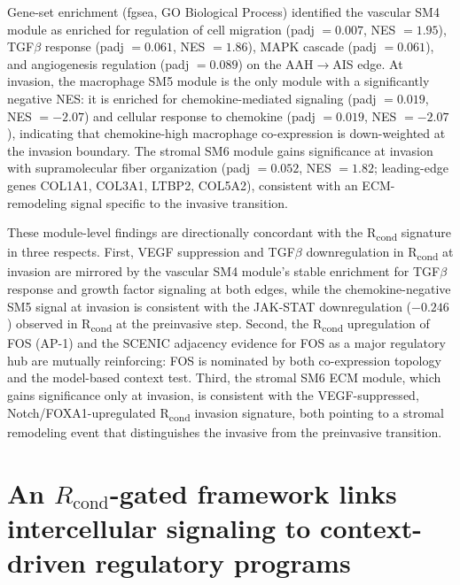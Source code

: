 Gene-set enrichment (fgsea, GO Biological Process) identified the vascular SM4 module as enriched for regulation of cell migration (padj $= 0.007$, NES $= 1.95$), TGF$\beta$ response (padj $= 0.061$, NES $= 1.86$), MAPK cascade (padj $= 0.061$), and angiogenesis regulation (padj $= 0.089$) on the AAH$\rightarrow$AIS edge. At invasion, the macrophage SM5 module is the only module with a significantly negative NES: it is enriched for chemokine-mediated signaling (padj $= 0.019$, NES $= -2.07$) and cellular response to chemokine (padj $= 0.019$, NES $= -2.07$), indicating that chemokine-high macrophage co-expression is down-weighted at the invasion boundary. The stromal SM6 module gains significance at invasion with supramolecular fiber organization (padj $= 0.052$, NES $= 1.82$; leading-edge genes COL1A1, COL3A1, LTBP2, COL5A2), consistent with an ECM-remodeling signal specific to the invasive transition.

These module-level findings are directionally concordant with the R\textsubscript{cond} signature in three respects. First, VEGF suppression and TGF$\beta$ downregulation in R\textsubscript{cond} at invasion are mirrored by the vascular SM4 module's stable enrichment for TGF$\beta$ response and growth factor signaling at both edges, while the chemokine-negative SM5 signal at invasion is consistent with the JAK-STAT downregulation ($-0.246$) observed in R\textsubscript{cond} at the preinvasive step. Second, the R\textsubscript{cond} upregulation of FOS (AP-1) and the SCENIC adjacency evidence for FOS as a major regulatory hub are mutually reinforcing: FOS is nominated by both co-expression topology and the model-based context test. Third, the stromal SM6 ECM module, which gains significance only at invasion, is consistent with the VEGF-suppressed, Notch/FOXA1-upregulated R\textsubscript{cond} invasion signature, both pointing to a stromal remodeling event that distinguishes the invasive from the preinvasive transition.

\section{An $R_{\text{cond}}$-gated framework links intercellular signaling to context-driven regulatory programs}
\label{sec:comm}

